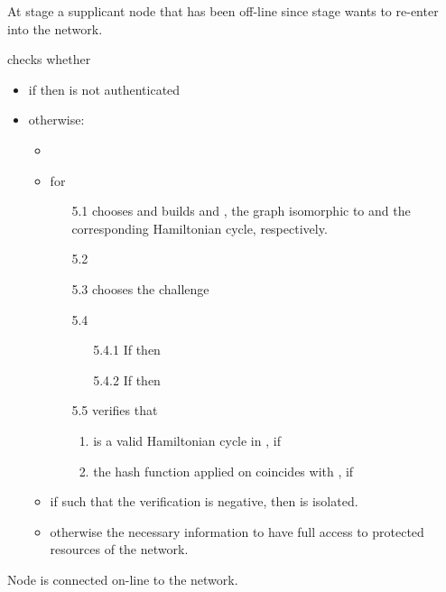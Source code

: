\documentclass[conference]{IEEEtran}
\begin{document}
\begin{description} 


\item  [Input:] At stage  a supplicant node  that has been off-line
since stage  wants to re-enter into the network.
\item [1.] 
    \item [2.] 
    \item [3.]  checks whether 
      \begin {itemize}
      \item [4.] if  then  is not authenticated
      \item [5.] otherwise:
      \begin{itemize}
        \item 
        \item for 
        \begin{enumerate}
             \item [5.1]   chooses  and builds   and , the graph
             isomorphic to  and the corresponding Hamiltonian cycle, respectively.
             \item [5.2] 
             \item [5.3]  chooses  the challenge 
             \item [5.4] 
             \begin{enumerate}
                    \item [5.4.1] If  then 
                    \item [5.4.2] If  then 
             \end{enumerate}
             \item [5.5]  verifies that
             \begin{enumerate}
                \item  is a valid Hamiltonian cycle in , if 
                \item the hash function  applied on  coincides with , if 
             \end{enumerate}
        \end{enumerate}
        \item if  such that the verification is negative, then  is isolated.
        \item otherwise  the necessary information to have full access
            to protected resources of the network.
    \end{itemize}
    \end{itemize}
\item [Output:]  Node  is connected on-line to the network.
\end{description}
\end{document}

